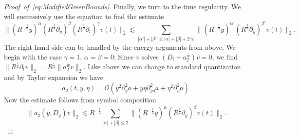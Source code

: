 \documentclass{amsart}
\theoremstyle{definition}
\begin{document}
\begin{proof}[Proof~of~\eqref{eq:ModifiedGreenBounds}]
Finally, we turn to the time regularity. We will successively use the equation to find the estimate
\begin{equation}
\label{eq:TimeDerivativeTrade}
\| (R^{-\frac{1}{2}} y)^{\alpha} (R^{\frac{1}{2}} \partial_y)^{\beta} (R^{\frac{1}{2}} \partial_t)^{\gamma} v(t) \|_2 \lesssim \sum_{|\alpha'| + |\beta'| \leq |\alpha| + |\beta| + 2 |\gamma|} \| ( R^{-\frac{1}{2}} y)^{\alpha'} (R^{\frac{1}{2}} \partial_y)^{\beta'} v(t) \|_2.
\end{equation}
The right hand side can be handled by the energy arguments from above.
We begin with the case $\gamma =1$, $\alpha = \beta = 0$: Since $v$ solves $(D_t + a_2^w) v = 0$, we find $\| R^{\frac{1}{2}} \partial_t v \|_2 = R^{\frac{1}{2}} \| a_2^w v \|_2$. Like above we can change to standard quantization and by Taylor expansion we have
\begin{equation*}
a_2(t,y,\eta) = \mathcal{O}(y^2 \partial_y^2 a + y \eta \partial^2_{y \eta} a + \eta^2 \partial_{\eta}^2 a).
\end{equation*}
Now the estimate follows from symbol composition
\begin{equation*}
\| a_2(y,D_y) v \|_2 \lesssim R^{-\frac{1}{2}} \sum_{|\alpha| + |\beta| \leq 2} \| (R^{-\frac{1}{2}} y)^{\alpha} (R^{\frac{1}{2}} \partial_y)^{\beta} v(t) \|_2.
\end{equation*}


\end{proof}
\end{document}
